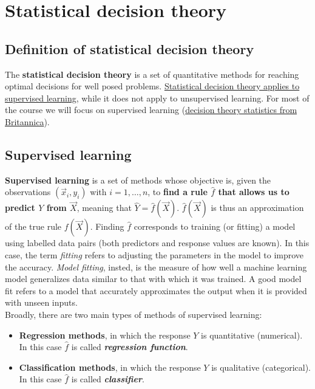 \graphicspath{{chapters/images/0202/}}

\chapter{Statistical decision theory}
  
  \section{Definition of statistical decision theory}
    The \textbf{statistical decision theory} is a set of quantitative methods
    for reaching optimal decisions for well posed problems. \underline{Statistical decision
    theory applies to supervised learning}, while it does not apply to
    unsupervised learning. For most of the course we will focus on supervised
    learning
    (\href{https://www.britannica.com/science/decision-theory-statistics}{decision
    theory statistics from Britannica}). 

  \section{Supervised learning}
    \textbf{Supervised learning} is a set of methods whose objective is, given
    the observations $(\vec{x}_i, y_i)$ with $i = 1, \dots, n$, to \textbf{find
    a rule $\hat{f}$ that allows us to predict $Y$ from $\vec{X}$}, meaning that
    $\hat{Y} = \hat{f}(\vec{X})$. $\hat{f}(\vec{X})$ is thus an approximation of
    the true rule $f(\vec{X})$. Finding $\hat{f}$ corresponds to training (or
    fitting) a model using labelled data pairs (both predictors and response
    values are known). In this case, the term \textit{fitting} refers to
    adjusting the parameters in the model to improve the accuracy. \textit{Model
    fitting}, insted, is the measure of how well a machine learning model
    generalizes data similar to that with which it was trained. A good model fit
    refers to a model that accurately approximates the output when it is
    provided with unseen inputs. \\


    Broadly, there are two main types of methods of supervised learning: 
    \begin{itemize}
      \item \textbf{Regression methods}, in which the response $Y$ is
      quantitative (numerical). In this case $\hat{f}$ is called
      \textbf{\textit{regression function}}.
      \item \textbf{Classification methods}, in which the response $Y$ is
      qualitative (categorical). In this case $\hat{f}$ is called
      \textbf{\textit{classifier}}.
    \end{itemize}
    
